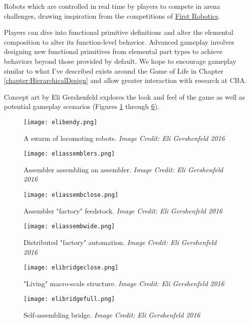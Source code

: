 {Robots which are controlled in real time by players to compete in arena challenges, drawing inspiration from the competitions of \href{http://www.firstinspires.org/robotics/frc}{First Robotics}.


Players can dive into functional primitive definitions and alter the elemental composition to alter its function-level behavior.  Advanced gameplay involves designing new functional primitives from elemental part types to achieve behaviors beyond those provided by default.  We hope to encourage gameplay similar to what I've described exists around the Game of Life in Chapter \ref{chapter:HierarchicalDesign} and allow greater interaction with research at CBA.

Concept art by Eli Gershenfeld explores the look and feel of the game as well as potential gameplay scenarios (Figures \ref{fig:elibendy} through \ref{fig:elibridgefull}).

\begin{figure}
  \texttt{[image: elibendy.png]}
  \caption{A swarm of locomoting robots.  \textit{Image Credit: Eli Gershenfeld 2016}}
  \label{fig:elibendy}
\end{figure}

\begin{figure}
  \texttt{[image: eliassemblers.png]}
  \caption{Assembler assembling an assembler.  \textit{Image Credit: Eli Gershenfeld 2016}}
  \label{fig:eliassemblers}
\end{figure}

\begin{figure}
  \texttt{[image: eliassembclose.png]}
  \caption{Assembler "factory" feedstock.  \textit{Image Credit: Eli Gershenfeld 2016}}
  \label{fig:eliassembclose}
\end{figure}

\begin{figure}
  \texttt{[image: eliassembwide.png]}
  \caption{Distributed "factory" automation. \textit{Image Credit: Eli Gershenfeld 2016}}
  \label{fig:eliassembwide}
\end{figure}

\begin{figure}
  \texttt{[image: elibridgeclose.png]}
  \caption{"Living" macro-scale structure.  \textit{Image Credit: Eli Gershenfeld 2016}}
  \label{fig:elibridgeclose}
\end{figure}

\begin{figure}
  \texttt{[image: elibridgefull.png]}
  \caption{Self-assembling bridge. \textit{Image Credit: Eli Gershenfeld 2016}}
  \label{fig:elibridgefull}
\end{figure}

}
